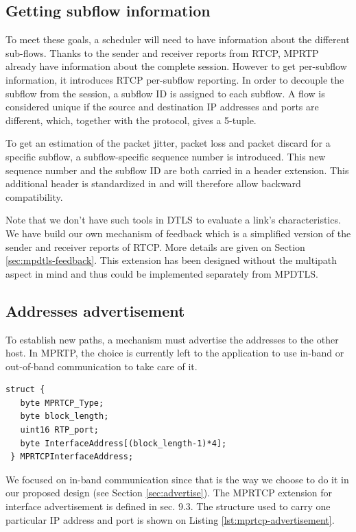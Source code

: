\subsection{Getting subflow information}

To meet these goals, a scheduler will need to have information about the different sub-flows. Thanks to the sender and receiver reports from RTCP, MPRTP already have information about the complete session. However to get per-subflow information, it introduces RTCP per-subflow reporting. In order to decouple the subflow from the session, a subflow ID is assigned to each subflow. A flow is considered unique if the source and destination IP addresses and ports are different, which, together with the protocol, gives a 5-tuple.

To get an estimation of the packet jitter, packet loss and packet discard for a specific subflow, a subflow-specific sequence number is introduced. This new sequence number and the subflow ID are both carried in a header extension. This additional header is standardized in \cite{RFC3550} and will therefore allow backward compatibility.

Note that we don't have such tools in DTLS to evaluate a link's characteristics. We have build our own mechanism of feedback which is a simplified version of the sender and receiver reports of RTCP. More details are given on Section \ref{sec:mpdtls-feedback}. This extension has been designed without the multipath aspect in mind and thus could be implemented separately from MPDTLS.

\subsection{Addresses advertisement}
\label{sec:mprtp-advertise}

To establish new paths, a mechanism must advertise the addresses to the other host. In MPRTP, the choice is currently \cite{singh-avtcore-mprtp} left to the application to use in-band or out-of-band communication to take care of it.

\begin{lstlisting}[caption=MPRTCP Interface Advertisement, label=lst:mprtcp-advertisement]
struct {
   byte MPRTCP_Type;
   byte block_length;
   uint16 RTP_port;
   byte InterfaceAddress[(block_length-1)*4];
 } MPRTCPInterfaceAddress;
\end{lstlisting}

We focused on in-band communication since that is the way we choose to do it in our proposed design (see Section \ref{sec:advertise}). The MPRTCP extension for interface advertisement is defined in \cite{singh-avtcore-mprtp} sec. 9.3. The structure used to carry one particular IP address and port is shown on Listing \ref{lst:mprtcp-advertisement}.

